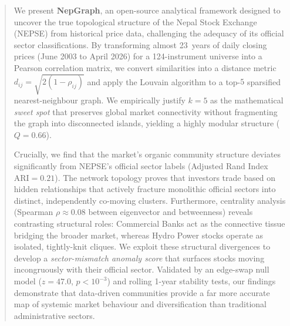 \begin{abstract}
\noindent
We present \textbf{NepGraph}, an open-source analytical framework designed to uncover the true topological structure of the Nepal Stock Exchange (NEPSE) from historical price data, challenging the adequacy of its official sector classifications. By transforming almost 23~years of daily closing prices (June 2003 to April 2026) for a 124-instrument universe into a Pearson correlation matrix, we convert similarities into a distance metric $d_{ij}=\sqrt{2(1-\rho_{ij})}$ and apply the Louvain algorithm to a top-$5$ sparsified nearest-neighbour graph. We empirically justify $k=5$ as the mathematical \emph{sweet spot} that preserves global market connectivity without fragmenting the graph into disconnected islands, yielding a highly modular structure ($Q=0.66$).

Crucially, we find that the market's organic community structure deviates significantly from NEPSE's official sector labels (Adjusted Rand Index $\text{ARI}=0.21$). The network topology proves that investors trade based on hidden relationships that actively fracture monolithic official sectors into distinct, independently co-moving clusters. Furthermore, centrality analysis (Spearman $\rho \approx 0.08$ between eigenvector and betweenness) reveals contrasting structural roles: Commercial Banks act as the connective tissue bridging the broader market, whereas Hydro Power stocks operate as isolated, tightly-knit cliques. We exploit these structural divergences to develop a \emph{sector-mismatch anomaly score} that surfaces stocks moving incongruously with their official sector. Validated by an edge-swap null model ($z=47.0$, $p<10^{-3}$) and rolling 1-year stability tests, our findings demonstrate that data-driven communities provide a far more accurate map of systemic market behaviour and diversification than traditional administrative sectors.
\end{abstract}

